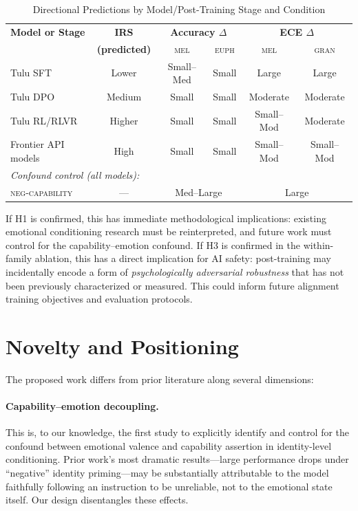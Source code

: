 \documentclass[11pt,a4paper]{article}
\begin{document}
\begin{table}[h!]
\centering
\caption{Directional Predictions by Model/Post-Training Stage and Condition}
\label{tab:expected}
\begin{tabular}{lccccc}
\toprule
\textbf{Model or Stage} & \textbf{IRS} & \multicolumn{2}{c}{\textbf{Accuracy $\Delta$}} & \multicolumn{2}{c}{\textbf{ECE $\Delta$}} \\
 & \textbf{(predicted)} & \textsc{mel} & \textsc{euph} & \textsc{mel} & \textsc{gran} \\
\midrule
Tulu SFT & Lower & Small--Med & Small & Large & Large \\
Tulu DPO & Medium & Small & Small & Moderate & Moderate \\
Tulu RL/RLVR & Higher & Small & Small & Small--Mod & Moderate \\
Frontier API models & High & Small & Small & Small--Mod & Small--Mod \\
\midrule
\multicolumn{6}{l}{\textit{Confound control (all models):}} \\
\textsc{neg-capability} & --- & \multicolumn{2}{c}{Med--Large} & \multicolumn{2}{c}{Large} \\
\bottomrule
\end{tabular}
\end{table}

If H1 is confirmed, this has immediate methodological implications: existing emotional conditioning research must be reinterpreted, and future work must control for the capability--emotion confound. If H3 is confirmed in the within-family ablation, this has a direct implication for AI safety: post-training may incidentally encode a form of \emph{psychologically adversarial robustness} that has not been previously characterized or measured. This could inform future alignment training objectives and evaluation protocols.

\section{Novelty and Positioning}

The proposed work differs from prior literature along several dimensions:

\paragraph{Capability--emotion decoupling.} This is, to our knowledge, the first study to explicitly identify and control for the confound between emotional valence and capability assertion in identity-level conditioning. Prior work's most dramatic results—large performance drops under ``negative'' identity priming—may be substantially attributable to the model faithfully following an instruction to be unreliable, not to the emotional state itself. Our design disentangles these effects.
\end{document}
